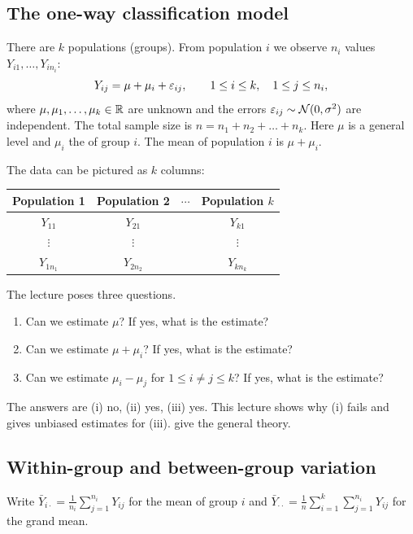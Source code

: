 \subsection{The one-way classification model}
\begin{definition}\label{def:L08-oneway}
There are $k$ populations (groups). From population $i$ we observe $n_i$ values $Y_{i1},\dots,Y_{in_i}$:
\[
Y_{ij}=\mu+\mu_i+\varepsilon_{ij},\qquad 1\le i\le k,\quad 1\le j\le n_i,
\]
where $\mu,\mu_1,\dots,\mu_k\in\mathbb R$ are unknown and the errors $\varepsilon_{ij}\sim\mathcal N(0,\sigma^2)$ are
independent. The total sample size is $n=n_1+n_2+\dots+n_k$. Here $\mu$ is a general
level and $\mu_i$ the  of group $i$. The mean of population $i$ is $\mu+\mu_i$.
\end{definition}
The data can be pictured as $k$ columns:
\begin{center}
\begin{tabular}{cccc}\hline
Population 1 & Population 2 & $\cdots$ & Population $k$\\\hline
$Y_{11}$ & $Y_{21}$ & & $Y_{k1}$\\
$\vdots$ & $\vdots$ & & $\vdots$\\
$Y_{1n_1}$ & $Y_{2n_2}$ & & $Y_{kn_k}$\\\hline
\end{tabular}
\end{center}

\begin{question}\label{q:L08-questions}
The lecture poses three questions.
\begin{enumerate}
  \item[(i)] Can we estimate $\mu$? If yes, what is the estimate?
  \item[(ii)] Can we estimate $\mu+\mu_i$? If yes, what is the estimate?
  \item[(iii)] Can we estimate $\mu_i-\mu_j$ for $1\le i\ne j\le k$? If yes, what is the estimate?
\end{enumerate}
\end{question}
The answers are (i) no, (ii) yes, (iii) yes. This lecture shows why (i) fails and gives
unbiased estimates for (iii).  give the general theory.

\subsection{Within-group and between-group variation}
Write $\bar Y_{i\cdot}=\frac1{n_i}\sum_{j=1}^{n_i}Y_{ij}$ for the mean of group $i$ and
$\bar Y_{\cdot\cdot}=\frac1n\sum_{i=1}^k\sum_{j=1}^{n_i}Y_{ij}$ for the grand mean.

